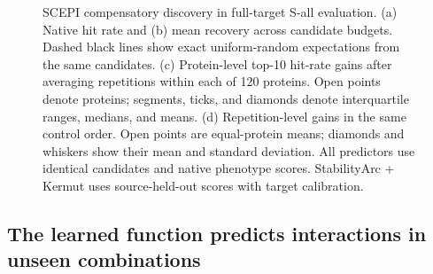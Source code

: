 \documentclass{llncs}
\begin{document}
\begin{figure}[!tbp]
\caption{SCEPI compensatory discovery in full-target S-all evaluation. (a) Native hit rate and (b) mean recovery across candidate budgets. Dashed black lines show exact uniform-random expectations from the same candidates. (c) Protein-level top-10 hit-rate gains after averaging repetitions within each of 120 proteins. Open points denote proteins; segments, ticks, and diamonds denote interquartile ranges, medians, and means. (d) Repetition-level gains in the same control order. Open points are equal-protein means; diamonds and whiskers show their mean and standard deviation. All predictors use identical candidates and native phenotype scores. StabilityArc + Kermut uses source-held-out scores with target calibration.}
\label{fig:compensation}
\end{figure}

\subsection{The learned function predicts interactions in unseen combinations}
\end{document}
